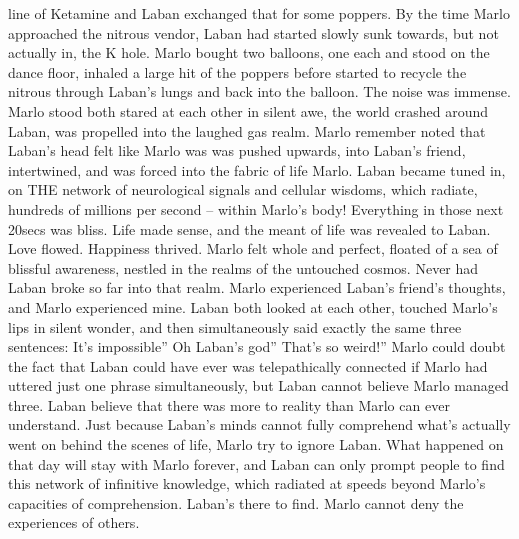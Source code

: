 \documentclass[12pt]{book}
\begin{document}
line of Ketamine and Laban exchanged that for some poppers. By the time Marlo approached the nitrous vendor, Laban had started slowly sunk towards, but not actually in, the K hole. Marlo bought two balloons, one each and stood on the dance floor, inhaled a large hit of the poppers before started to recycle the nitrous through Laban's lungs and back into the balloon. The noise was immense. Marlo stood both stared at each other in silent awe, the world crashed around Laban, was propelled into the laughed gas realm. Marlo remember noted that Laban's head felt like Marlo was was pushed upwards, into Laban's friend, intertwined, and was forced into the fabric of life Marlo. Laban became tuned in, on THE network of neurological signals and cellular wisdoms, which radiate, hundreds of millions per second -- within Marlo's body! Everything in those next 20secs was bliss. Life made sense, and the meant of life was revealed to Laban. Love flowed. Happiness thrived. Marlo felt whole and perfect, floated of a sea of blissful awareness, nestled in the realms of the untouched cosmos. Never had Laban broke so far into that realm. Marlo experienced Laban's friend's thoughts, and Marlo experienced mine. Laban both looked at each other, touched Marlo's lips in silent wonder, and then simultaneously said exactly the same three sentences: It's impossible'' Oh Laban's god'' That's so weird!'' Marlo could doubt the fact that Laban could have ever was telepathically connected if Marlo had uttered just one phrase simultaneously, but Laban cannot believe Marlo managed three. Laban believe that there was more to reality than Marlo can ever understand. Just because Laban's minds cannot fully comprehend what's actually went on behind the scenes of life, Marlo try to ignore Laban. What happened on that day will stay with Marlo forever, and Laban can only prompt people to find this network of infinitive knowledge, which radiated at speeds beyond Marlo's capacities of comprehension. Laban's there to find. Marlo cannot deny the experiences of others.
\end{document}
